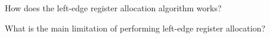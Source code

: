 \begin{Exercise}
How does the left-edge register allocation algorithm works?
\end{Exercise}

\begin{Exercise}
What is the main limitation of performing left-edge register allocation?
\end{Exercise}